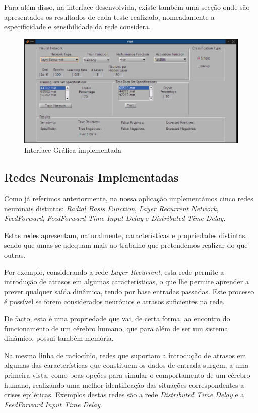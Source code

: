 \documentclass{article}
\begin{document}
Para além disso, na interface desenvolvida, existe também uma secção onde são apresentados os resultados de cada teste realizado, nomeadamente a especificidade e sensibilidade da rede considera.

\begin{figure}[h]
  \centering
      \includegraphics[scale=0.3]{Images/Aplication_GUI.png}
  \caption{Interface Gráfica implementada}
\end{figure}

\subsection{Redes Neuronais Implementadas}

Como já referimos anteriormente, na nossa aplicação implementámos cinco redes neuronais distintas: \emph{Radial Basis Function}, \emph{Layer Recurrent Network}, \emph{FeedForward}, \emph{FeedForward Time Input Delay} e \emph{Distributed Time Delay}.

Estas redes apresentam, naturalmente, características e propriedades distintas, sendo que umas se adequam mais ao trabalho que pretendemos realizar do que outras.

Por exemplo, considerando a rede \emph{Layer Recurrent}, esta rede permite a introdução de atrasos em algumas características, o que lhe permite aprender a prever qualquer saída dinâmica, tendo por base entradas passadas. Este processo é possível se forem considerados neurónios e atrasos suficientes na rede.

De facto, esta é uma propriedade que vai, de certa forma, ao encontro do funcionamento de um cérebro humano, que para além de ser um sistema dinâmico, possui também memória.

Na mesma linha de raciocínio, redes que suportam a introdução de atrasos em algumas das características que constituem os dados de entrada surgem, a uma primeira vista, como boas opções para simular o comportamento de um cérebro humano, realizando uma melhor identificação das situações correspondentes a crises epiléticas. Exemplos destas redes são a rede \emph{Distributed Time Delay} e a \emph{FeedForward Input Time Delay}.
\end{document}
